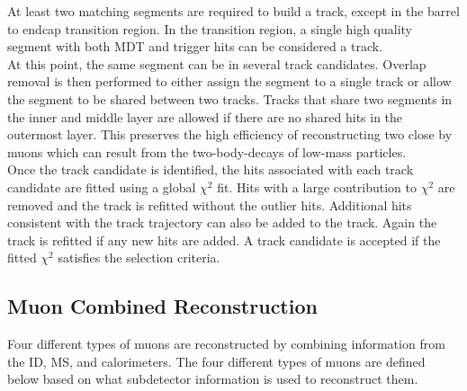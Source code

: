 \indent At least two matching segments are required to build a track, except in the barrel to endcap transition region.  In the transition region, a single high quality segment with both MDT and trigger hits can be considered a track. \\

\indent At this point, the same segment can be in several track candidates.  Overlap removal is then performed to either assign the segment to a single track or allow the segment to be shared between two tracks.  Tracks that share two segments in the inner and middle layer are allowed if there are no shared hits in the outermost layer.  This preserves the high efficiency of reconstructing two close by muons which can result from the two-body-decays of low-mass particles.  \\

\indent Once the track candidate is identified, the hits associated with each track candidate are fitted using a global $\chi^2$ fit.  Hits with a large contribution to $\chi^2$ are removed and the track is refitted without the outlier hits.  Additional hits consistent with the track trajectory can also be added to the track.  Again the track is refitted if any new hits are added.  A track candidate is accepted if the fitted $\chi^2$ satisfies the selection criteria.  \\

\subsection{Muon Combined Reconstruction}
\label{sec:reco:MuonComb}

\indent Four different types of muons are reconstructed by combining information from the ID, MS, and calorimeters.  The four different types of muons are defined below based on what subdetector information is used to reconstruct them. \\

